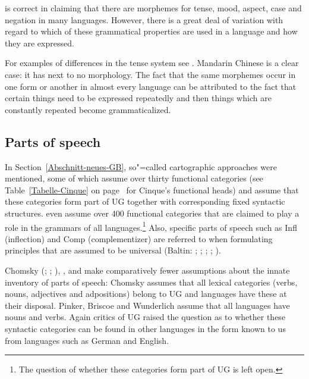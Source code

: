 \citet[]{Pinker94a} is correct in claiming that there are morphemes for tense, mood, aspect, case and negation in many languages. However, there is a great
deal of variation with regard to which of these grammatical properties are used in a language and
how they are expressed.

For examples of differences in the tense system see . Mandarin
Chinese is a clear case: it has next to no morphology. The fact that the same morphemes occur in one form or another in almost every language
can be attributed to the fact that certain things need to be expressed repeatedly and then things which are constantly repeated become grammaticalized.



\subsection{Parts of speech}
\label{Abschnitt-UG-Wortarten}

In Section~\ref{Abschnitt-neues-GB}, so"=called cartographic approaches were mentioned, some of which assume over thirty functional categories
(see Table~\ref{Tabelle-Cinque} on page~\pageref{Tabelle-Cinque} for Cinque's functional heads) and assume that these categories form part of UG together with corresponding fixed syntactic structures.
\citet[, 57]{CR2010a} even assume over 400 functional categories
that are claimed to play a role in the grammars of all languages.\footnote{
	The question of whether these categories form part of UG is left open.
}
Also, specific parts of speech such as \mbox{Infl} (inflection) and
Comp (complementizer) are referred to when formulating principles that are assumed to be universal (Baltin: \citeyear[]{Baltin81a}; \citeyear{Baltin2006a}; \citealp{Rizzi82b}; \citealp[]{Chomsky86b};
\citealp[]{Hornstein2013a}). 

Chomsky (\citeyear[]{Chomsky88a-u}; \citeyear{Chomsky91a-u};
\citeyear[]{Chomsky95a-u}), \citet[, 286]{Pinker94a}, \citet[]{Briscoe2000a} and
\citet[]{Wunderlich2004a} make comparatively fewer assumptions about the innate inventory of parts of speech:
Chomsky assumes that all lexical categories (verbs,  nouns,
adjectives and adpositions) belong to UG and languages have these at their disposal.
Pinker, Briscoe and Wunderlich assume that all languages have nouns and verbs.
Again critics of UG raised the question as to whether these syntactic categories can be found in other languages in the form known to us from languages such as German and English.

